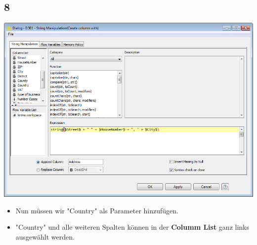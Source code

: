 \documentclass{beamer}
\begin{document}
\subsection{8}
\begin{frame}
	\begin{center}
  		\includegraphics[height=0.6\textheight]{8.png}
	\end{center}
	\begin{itemize}
		\item Nun müssen wir "Country" als Parameter hinzufügen.
		\item "Country" und alle weiteren Spalten können in der \textbf{Columm List} ganz links ausgewählt werden.
	\end{itemize}
\end{frame}
\end{document}
